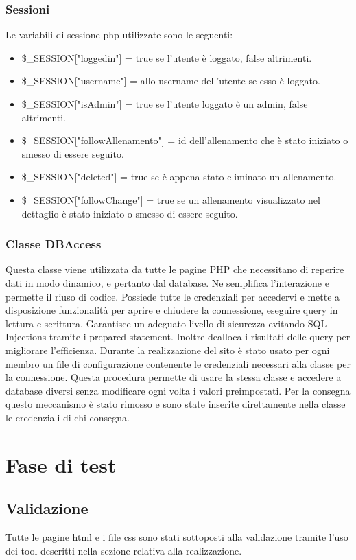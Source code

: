 \documentclass[a4paper]{article}
\begin{document}
	\subsubsection{Sessioni}
	Le variabili di sessione php utilizzate sono le seguenti:
	\begin{itemize}
		\item \$\_SESSION["loggedin"] = true se l'utente è loggato, false altrimenti.
		\item \$\_SESSION["username"] = allo username dell'utente se esso è loggato.
		\item \$\_SESSION["isAdmin"] = true se l'utente loggato è un admin, false altrimenti.
		\item \$\_SESSION["followAllenamento"] = id dell'allenamento che è stato iniziato o smesso di essere seguito.
		\item \$\_SESSION["deleted"] = true se è appena stato eliminato un allenamento.
		\item \$\_SESSION["followChange"] = true se un allenamento visualizzato nel dettaglio è stato iniziato o smesso di essere seguito.

	\end{itemize}
	\subsubsection{Classe DBAccess}
	Questa classe viene utilizzata da tutte le pagine PHP che necessitano di reperire dati in modo dinamico, e pertanto dal database. Ne semplifica l'interazione e permette il riuso di codice. Possiede tutte le credenziali per accedervi e mette a disposizione funzionalità per aprire e chiudere la connessione, eseguire query in lettura e scrittura. Garantisce un adeguato livello di sicurezza evitando SQL Injections tramite i prepared statement. Inoltre dealloca i risultati delle query per migliorare l'efficienza. Durante la realizzazione del sito è stato usato per ogni membro un file di configurazione contenente le credenziali necessari alla classe per la connessione. Questa procedura permette di usare la stessa classe e accedere a database diversi senza modificare ogni volta i valori preimpostati. Per la consegna questo meccanismo è stato rimosso e sono state inserite direttamente nella classe le credenziali di chi consegna.

	\section{Fase di test}
	\subsection{Validazione}
	Tutte le pagine html e i file css sono stati sottoposti alla validazione tramite l'uso dei tool descritti nella sezione relativa alla realizzazione.
	
\end{document}
